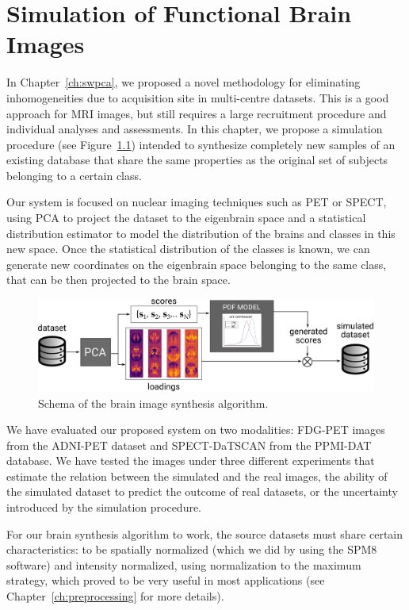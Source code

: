 \chapter{Simulation of Functional Brain Images}\label{ch:simulation}
In Chapter~\ref{ch:swpca}, we proposed a novel methodology for eliminating inhomogeneities due to acquisition site in multi-centre datasets. This is a good approach for \ac{MRI} images, but still requires a large recruitment procedure and individual analyses and assessments. In this chapter, we propose a simulation procedure (see Figure~\ref{fig:simulationSchema}) intended to synthesize completely new samples of an existing database that share the same properties as the original set of subjects belonging to a certain class.  

Our system is focused on nuclear imaging techniques such as \ac{PET} or \ac{SPECT}, using \ac{PCA} to project the dataset to the eigenbrain space and a statistical distribution estimator to model the distribution of the brains and classes in this new space. Once the statistical distribution of the classes is known, we can generate new coordinates on the eigenbrain space belonging to the same class, that can be then projected to the brain space.
 
\begin{figure}[htp]
	\centering
	\includegraphics[width=\textwidth]{Graphics/ch8/SchemaGeneration}
	\caption{Schema of the brain image synthesis algorithm.}
	\label{fig:simulationSchema}
\end{figure} 

We have evaluated our proposed system on two modalities: FDG-\ac{PET} images from the ADNI-PET dataset and \ac{SPECT}-DaTSCAN from the PPMI-DAT database. We have tested the images under three different experiments that estimate the relation between the simulated and the real images, the ability of the simulated dataset to predict the outcome of real datasets, or the uncertainty introduced by the simulation procedure. 

For our brain synthesis algorithm to work, the source datasets must share certain characteristics: to be spatially normalized (which we did by using the SPM8 software) and intensity normalized, using normalization to the maximum strategy, which proved to be very useful in most applications \cite{Martinez-Murcia20129676,martinez2014parametrization} (see Chapter~\ref{ch:preprocessing} for more details).

